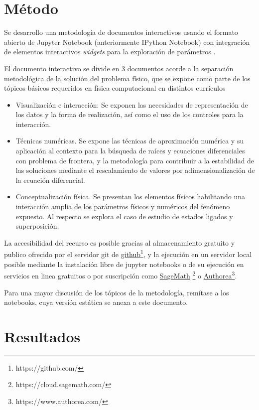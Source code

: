 \documentclass{article}
\begin{document}
\section{Método}

Se desarrollo una metodología de documentos interactivos usando el formato abierto de Jupyter Notebook (anteriormente IPython Notebook) con integración de elementos interactivos \textit{widgets} para la exploración de parámetros \cite{Jupyter2015}.

El documento interactivo se divide en 3 documentos acorde a la separación metodológica de la solución del problema físico, que se expone como parte de los tópicos básicos requeridos en física computacional en distintos currículos \cite{Landau2006, Landau2011}

\begin{itemize}
\item Visualización e interacción: Se exponen las necesidades de representación de los datos y la forma de realización, así como el uso de los controles para la interacción.
\item Técnicas numéricas. Se expone las técnicas de aproximación numérica y su aplicación al contexto para la búsqueda de raíces y ecuaciones diferenciales con problema de frontera, y la metodología para contribuir a la estabilidad de las soluciones mediante el rescalamiento de valores por adimensionalización de la ecuación diferencial.
\item Conceptualización física. Se presentan los elementos físicos habilitando una interacción amplia de los parámetros físicos y numéricos del fenómeno expuesto. Al respecto se explora el caso de estudio de estados ligados y superposición.
\end{itemize}

La accesibilidad del recurso es posible gracias al almacenamiento gratuito y publico ofrecido por el servidor git de \href{https://github.com/}{github}\footnote{https://github.com/}, y la ejecución en un servidor local posible mediante la instalación libre de jupyter notebooks o de su ejecución en servicios en linea gratuitos o por suscripción como \href{https://cloud.sagemath.com/}{SageMath} \footnote{https://cloud.sagemath.com/} o \href{https://www.authorea.com/}{Authorea}\footnote{https://www.authorea.com/}.

Para una mayor discusión de los tópicos de la metodología, remítase a los notebooks, cuya versión estática se anexa a este documento.

\section{Resultados}
\end{document}
